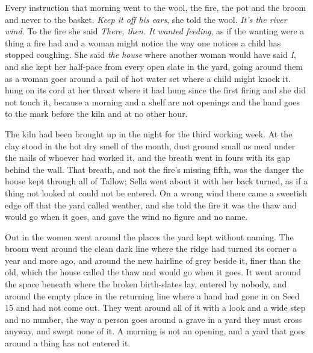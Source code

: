 Every instruction that morning went to the wool, the fire, the pot and the broom and never to the basket. \emph{Keep it off his ears}, she told the wool. \emph{It's the river wind}. To the fire she said \emph{There, then. It wanted feeding}, as if the wanting were a thing a fire had and a woman might notice the way one notices a child has stopped coughing. She said \emph{the house} where another woman would have said \emph{I}, and she kept her half-pace from every open slate in the yard, going around them as a woman goes around a pail of hot water set where a child might knock it.  hung on its cord at her throat where it had hung since the first firing and she did not touch it, because a morning and a shelf are not openings and the hand goes to the mark before the kiln and at no other hour.

The kiln had been brought up in the night for the third working week. At  the clay stood in the hot dry smell of the month, dust ground small as meal under the nails of whoever had worked it, and the breath went in fours with its gap behind the wall. That breath, and not the fire's missing fifth, was the danger the house kept through all of Tallow; Sella went about it with her back turned, as if a thing not looked at could not be entered. On a wrong wind there came a sweetish edge off  that the yard called weather, and she told the fire it was the thaw and would go when it goes, and gave the wind no figure and no name.

\scenebreak

Out in  the women went around the places the yard kept without naming. The broom went around the clean dark line where the  ridge had turned its corner a year and more ago, and around the new hairline of grey beside it, finer than the old, which the house called the thaw and would go when it goes. It went around the space beneath  where the broken birth-slates lay, entered by nobody, and around the empty place in the returning line where a hand had gone in on Seed 15 and had not come out. They went around all of it with a look and a wide step and no number, the way a person goes around a grave in a yard they must cross anyway, and swept none of it. A morning is not an opening, and a yard that goes around a thing has not entered it.

